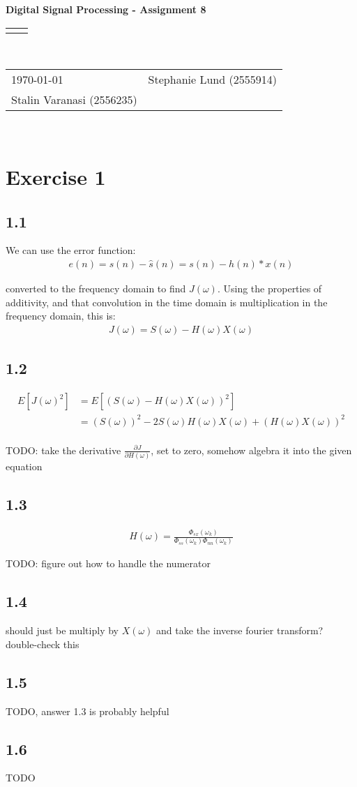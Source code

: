 \documentclass[12pt]{article}
\renewcommand{\title}[1]{\textbf{#1}\\}
\renewcommand{\line}{\begin{tabularx}{\textwidth}{X>{\raggedleft}X}\hline\\\end{tabularx}\\[-0.5cm]}
\newcommand{\leftright}[2]{\begin{tabularx}{\textwidth}{X>{\raggedleft}X}#1%
& #2\\\end{tabularx}\\[-0.5cm]}
\begin{document}
\title{Digital Signal Processing - Assignment 8}
\line
\leftright{\today}{Stephanie Lund (2555914)\\Stalin Varanasi (2556235)} %

\section*{Exercise 1}

\subsection*{1.1}
We can use the error function:
\begin{align*}
e(n) = s(n) - \hat{s}(n) = s(n) - h(n) \ast x(n)
\end{align*}

converted to the frequency domain to find $J(\omega)$. Using the properties of additivity, and that convolution in the time domain is multiplication in the frequency domain, this is:
\begin{align*}
J(\omega) = S(\omega) - H(\omega)X(\omega)
\end{align*}

\subsection*{1.2}
\begin{align*}
E[J(\omega)^2] &= E[(S(\omega) - H(\omega)X(\omega))^2] \\
&= (S(\omega))^2 - 2S(\omega)H(\omega)X(\omega) + (H(\omega)X(\omega))^2 \\
\end{align*}

TODO: take the derivative $\frac{\partial J}{\partial H(\omega)}$, set to zero, somehow algebra it into the given equation\\

\subsection*{1.3}
\begin{align*}
H(\omega) = \frac{\Phi_{sx}(\omega_k)}{\Phi_{ss}(\omega_k) \Phi_{nn}(\omega_k)}
\end{align*}

TODO: figure out how to handle the numerator

\subsection*{1.4}
should just be multiply by $X(\omega)$ and take the inverse fourier transform? double-check this

\subsection*{1.5}
TODO, answer 1.3 is probably helpful

\subsection*{1.6}
TODO
\end{document}
